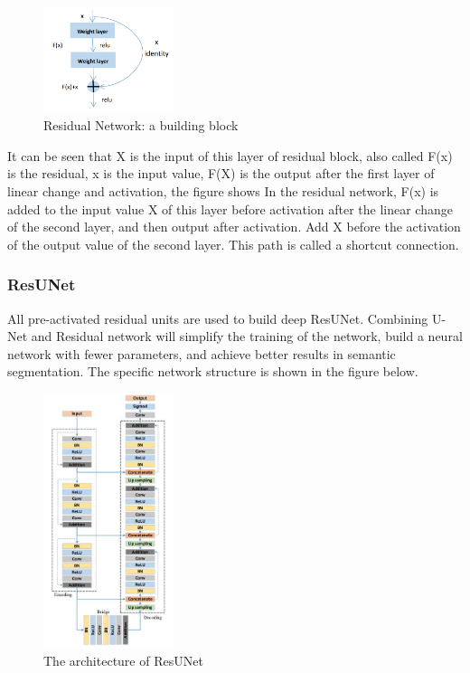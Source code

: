 \documentclass{article}
\begin{document}
\begin{figure}[H]
    \centering
    \includegraphics[width = 1.5in]{Residual Network}
    \caption{Residual Network: a building block}
    \label{Residual Network: a building block}
\end{figure}

It can be seen that X is the input of this layer of residual block, also called F(x) is the residual, x is the input value, F(X) is the output after the first layer of linear change and activation, the figure shows In the residual network, F(x) is added to the input value X of this layer before activation after the linear change of the second layer, and then output after activation. Add X before the activation of the output value of the second layer. This path is called a shortcut connection.
\subsubsection{ResUNet}
All pre-activated residual units are used to build deep ResUNet. Combining U-Net and Residual network will simplify the training of the network, build a neural network with fewer parameters, and achieve better results in semantic segmentation. The specific network structure is shown in the figure below.\cite{zhang2018road}

\begin{figure}[H]
    \centering
    \includegraphics[width = 1.5in]{architecture of ResUNet}
    \caption{The architecture of ResUNet}
    \label{The architecture of ResUNet}
\end{figure}
\end{document}

